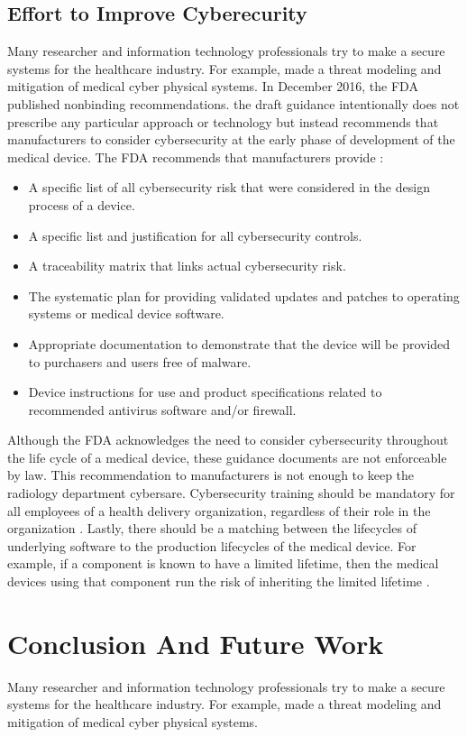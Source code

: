 \documentclass[pdf,bookmarks,colorlinks=true]{IEEEtran}
\begin{document}
\subsection{Effort to Improve Cyberecurity}
Many researcher and information technology professionals try to make a secure systems for the healthcare industry. For example, \cite{Almohri:2017:TMM:3204094.3204113} made a threat modeling and mitigation of medical cyber physical systems. In December 2016, the FDA published nonbinding recommendations. the draft guidance intentionally does not prescribe any particular approach or technology but instead recommends that manufacturers to consider cybersecurity at the early phase of development of the medical device. The FDA recommends that manufacturers provide \cite{fu2014controlling}: 
\begin{itemize}
	\item A specific list of all cybersecurity risk that were considered in the design process of a device.
	\item A specific list and justification for all cybersecurity controls.
	\item A traceability matrix that links actual cybersecurity risk.
	\item The systematic plan for providing validated updates and patches to operating systems or medical device software.
	\item Appropriate documentation to demonstrate that the device will be provided to purchasers and users free of malware.
	\item Device instructions for use and product specifications related to recommended antivirus software and/or firewall. 
\end{itemize}
Although the FDA acknowledges the need to consider cybersecurity throughout the life cycle of a medical device, these guidance documents are not enforceable by law. This recommendation to manufacturers is not enough to keep the radiology department cybersare. Cybersecurity training should be mandatory for all employees of a health delivery organization, regardless of their role in the organization \cite{ferrara2019cybersecurity}. Lastly, there should be a matching between the lifecycles of underlying software to the production lifecycles of the medical device. For example, if a component is known to have a limited lifetime, then the medical devices using that component run the risk of inheriting the limited lifetime \cite{fu2014controlling}.

\section{Conclusion And Future Work}
\label{sec:Conclusion}
Many researcher and information technology professionals try to make a secure systems for the healthcare industry. For example, \cite{Almohri:2017:TMM:3204094.3204113} made a threat modeling and mitigation of medical cyber physical systems. 





\end{document}
